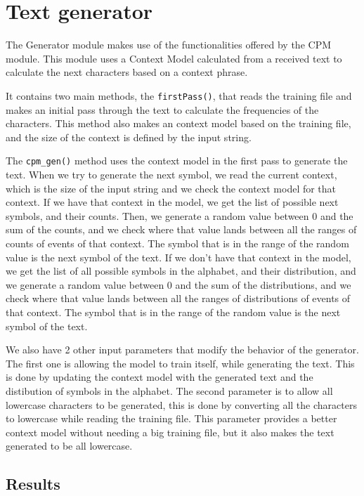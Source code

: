 \documentclass{article}
\begin{document}
\section{Text generator}
\label{sec:text-generator}

The Generator module makes use of the functionalities offered by the CPM module.
This module uses a Context Model calculated from a received text to calculate the
next characters based on a context phrase. 

It contains two main methods, the \verb|firstPass()|, that reads the training file and makes an initial pass through the text to calculate the frequencies of the characters.
This method also makes an context model based on the training file, and the size of the context is defined by the input string. 

The \verb|cpm_gen()| method uses the context model in the first pass to generate the text.
When we try to generate the next symbol, we read the current context, which is the size of the input string and we check the context model for that context. If we have that context in the model, we get the list of possible next symbols, and their counts. Then, we generate a random value between 0 and the sum of the counts, and we check where that value lands between all the ranges of counts of events of that context. The symbol that is in the range of the random value is the next symbol of the text.
If we don't have that context in the model, we get the list of all possible symbols in the alphabet, and their distribution, and we generate a random value between 0 and the sum of the distributions, and we check where that value lands between all the ranges of distributions of events of that context. The symbol that is in the range of the random value is the next symbol of the text. 

We also have 2 other input parameters that modify the behavior of the generator. The first one is allowing the model to train itself, while generating the text. This is done by updating the context model with the generated text and the distibution of symbols in the alphabet.
The second parameter is to allow all lowercase characters to be generated, this is done by converting all the characters to lowercase while reading the training file. This parameter provides a better context model without needing a big training file, but it also makes the text generated to be all lowercase.


\subsection{Results}
\end{document}

